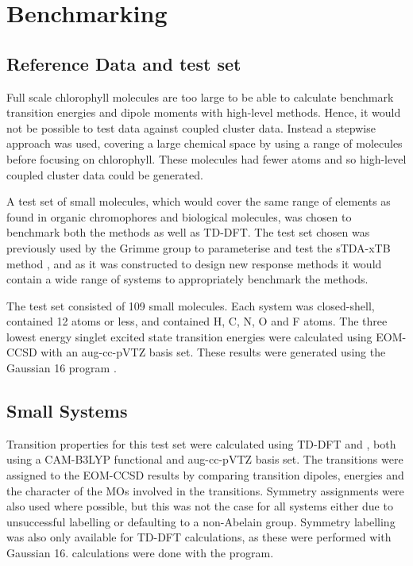 \section{Benchmarking \dscf}
\label{sec:benchmarking}
\subsection{Reference Data and test set}
\label{subsec:reference_data}
Full scale chlorophyll molecules are too large to be able to calculate benchmark
transition energies and dipole moments with high-level methods. Hence, it would
not be possible to test \dscf data against coupled cluster data. Instead a stepwise
approach was used, covering a large chemical space by using a range of molecules 
before focusing on chlorophyll. These molecules had fewer atoms and so high-level
coupled cluster data could be generated.

A test set of small molecules, which would cover the same range of elements as found
in organic chromophores and biological molecules, was chosen to benchmark both the
\dscf methods as well as TD-DFT. The test set chosen was previously used by the 
Grimme group to parameterise and test the sTDA-xTB method \cite{Grimme2017}, and
as it was constructed to design new response methods it would contain a wide range
of systems to appropriately benchmark the \dscf methods.

The test set consisted of 109 small molecules. Each system was closed-shell, contained
12 atoms or less, and contained H, C, N, O and F atoms. The three lowest energy
singlet excited state transition energies were calculated using EOM-CCSD with an
aug-cc-pVTZ basis set. These results were generated using the Gaussian 16 program
\cite{Gaussian16}.

\subsection{Small Systems}
\label{subsec:smalltest}
Transition properties for this test set were calculated using TD-DFT and \dscf,
both using a CAM-B3LYP functional and aug-cc-pVTZ basis set. The transitions were
assigned to the EOM-CCSD results by comparing transition dipoles, energies and 
the character of the MOs involved in the transitions. Symmetry assignments were
also used where possible, but this was not the case for all systems either due to
unsuccessful labelling or defaulting to a non-Abelain group. Symmetry labelling 
was also only available for TD-DFT calculations, as these were performed with Gaussian
16. \dscf calculations were done with the  program.

